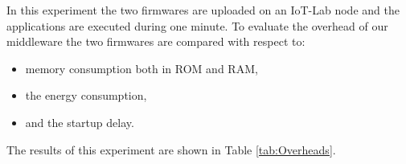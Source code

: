 
In this experiment the two firmwares are uploaded on an IoT-Lab node and the applications are executed during one minute.
To evaluate the overhead of our middleware the two firmwares are compared with respect to:

\begin{itemize}
	\item memory consumption both in ROM and RAM, 
	\item the energy consumption,
	\item and the startup delay.
\end{itemize}

The results of this experiment are shown in Table \ref{tab:Overheads}. 

